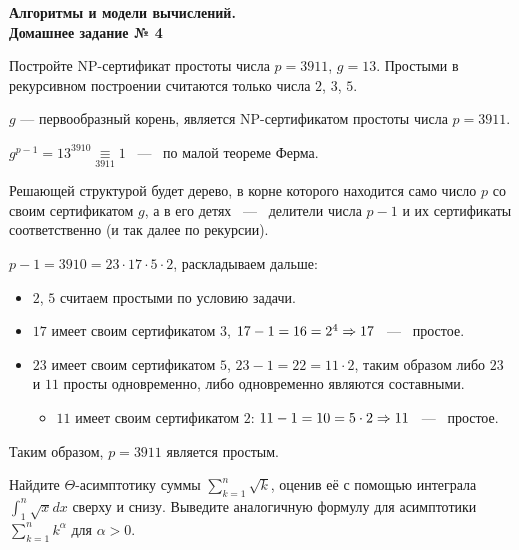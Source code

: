 \documentclass[a4paper,12pt]{article}
\begin{document}
	
	\thispagestyle{firstpage}
	
	\begin{center}
		\textbf{\Large{Алгоритмы и модели вычислений. \\ Домашнее задание № 4}}
	\end{center}
	
\begin{tasknum}{1}
	Постройте NP-сертификат простоты числа $p = 3911$, $g = 13$. Простыми в рекурсивном построении считаются только числа $2$, $3$, $5$.
\end{tasknum}

\begin{solution}
	
	$g$ --- первообразный корень, является NP-сертификатом простоты числа $p = 3911$.
	
	$g^{p-1} = 13^{3910} \underset{3911}{\equiv} 1$ ~---~ по малой теореме Ферма.
	
	Решающей структурой будет дерево, в корне которого находится само число $p$ со своим сертификатом $g$, а в его детях ~---~ делители числа $p-1$ и их сертификаты соответственно (и так далее по рекурсии).
	
	$p-1 = 3910 = 23 \cdot 17 \cdot 5 \cdot 2$, раскладываем дальше:
	
	\begin{itemize}
		\item $2$, $5$ считаем простыми по условию задачи.
		\item $17$ имеет своим сертификатом $3$, $17-1=16=2^4 \Rightarrow 17$ ~---~ простое.
		\item $23$ имеет своим сертификатом $5$, $23-1=22=11 \cdot 2$, таким образом либо $23$ и $11$ просты одновременно, либо одновременно являются составными.
		
		\begin{itemize}
			\item $11$ имеет своим сертификатом $2$: $11-1=10 = 5 \cdot 2 \Rightarrow 11$ ~---~ простое.
		\end{itemize}
		
	\end{itemize}
	
	Таким образом, $p=3911$ является простым.
	
\end{solution}

\begin{tasknum}{2}
	Найдите $\Theta$-асимптотику суммы $\displaystyle\sum_{k=1}^n \sqrt{k}$, оценив её с помощью интеграла $\displaystyle\int_1^n \sqrt{x}dx$ сверху и снизу. Выведите аналогичную формулу для асимптотики $\displaystyle\sum_{k=1}^n k^\alpha$ для $\alpha > 0$.
\end{tasknum}
\end{document}
